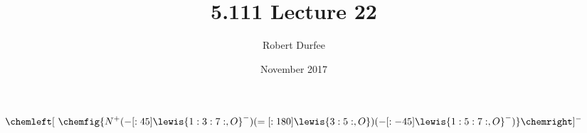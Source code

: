 \documentclass{article}
\title{5.111 Lecture 22}
\author{Robert Durfee}
\date{November 2017}
\begin{document}
\maketitle

$$\chemleft[\
\chemfig{N^{+}(-[:45]\lewis{1:3:7:,O}^{-})(=[:180]\lewis{3:5:,O})(-[:-45]\lewis{1:5:7:,O}^{-})}\chemright]^{-}$$

\end{document}
